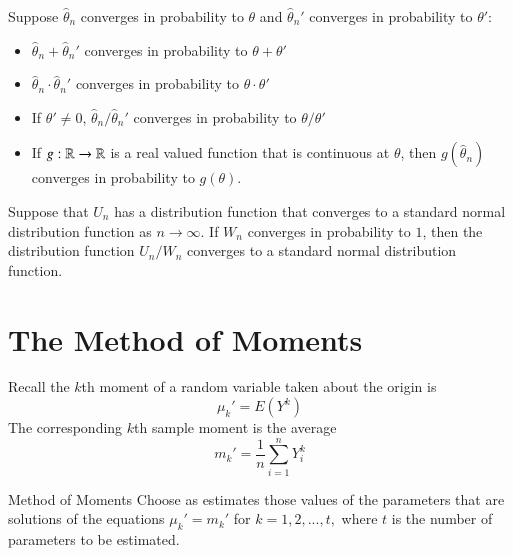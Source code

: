 \documentclass[12pt, a4paper, twoside, openright, titlepage]{book}
\begin{document}
\begin{thm}{}{}
    Suppose $\hat{\theta}_n$ converges in probability to $\theta$ and $\hat{\theta}_n'$ converges in probability to $\theta'$: \begin{itemize}
        \item $\hat{\theta}_n + \hat{\theta}_n'$ converges in probability to $\theta+\theta'$
        \item $\hat{\theta}_n\cdot\hat{\theta}_n'$ converges in probability to $\theta\cdot\theta'$
        \item If $\theta'\neq 0$, $\hat{\theta}_n/\hat{\theta}_n'$ converges in probability to $\theta/\theta'$
        \item If $g:\mathbb R\rightarrow \mathbb R$ is a real valued function that is continuous at $\theta$, then $g(\hat{\theta}_n)$ converges in probability to $g(\theta)$.
    \end{itemize}
\end{thm}

\begin{thm}{}{}
    Suppose that $U_n$ has a distribution function that converges to a standard normal distribution function as $n\rightarrow \infty$. If $W_n$ converges in probability to $1$, then the distribution function $U_n/W_n$ converges to a standard normal distribution function.
\end{thm}

\section{\textsection The Method of Moments}


\begin{rec}{}{}
    Recall the $k$th moment of a random variable taken about the origin is \begin{equation*}
        \mu_k' = E(Y^k)
    \end{equation*}
    The corresponding $k$th sample moment is the average \begin{equation*}
        m_k' = \frac{1}{n}\sum_{i=1}^nY_i^k
    \end{equation*}
\end{rec}


\begin{proc}{Method of Moments}{}
    Choose as estimates those values of the parameters that are solutions of the equations $\mu_k' = m_k'$ for $k=1,2,...,t,$ where $t$ is the number of parameters to be estimated.
\end{proc}
\end{document}
